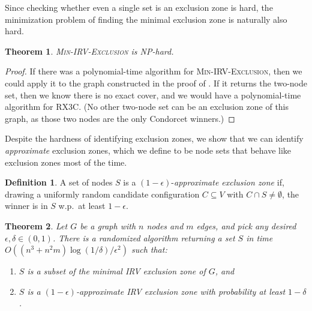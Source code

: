 \documentclass{article}
\theoremstyle{theorem}
\newtheorem{theorem}{Theorem}
\theoremstyle{definition}
\newtheorem{definition}{Definition}
\begin{document}
Since checking whether even a single set is an exclusion zone is hard, the minimization problem of finding the minimal exclusion zone is naturally also hard.

\begin{theorem}
  \textsc{Min-IRV-Exclusion} is NP-hard.
\end{theorem}
\begin{proof}
If there was a polynomial-time algorithm for  \textsc{Min-IRV-Exclusion}, then we could apply it to the graph constructed in the proof of . If it returns the two-node set, then we know there is no exact cover, and we would have a polynomial-time algorithm for \textsc{RX3C}. (No other two-node set can be an exclusion zone of this graph, as those two nodes are the only Condorcet winners.)
\end{proof}


Despite the hardness of identifying exclusion zones, we show that we can identify \emph{approximate} exclusion zones, which we define to be node sets that behave like exclusion zones most of the time.

\begin{definition}
  A set of nodes $S$ is a $(1-\epsilon)$-\emph{approximate exclusion zone} if, drawing a uniformly random candidate configuration $C \subseteq V$ with $C \cap S \ne \emptyset$, the winner is in $S$ w.p.\ at least $1- \epsilon$.  
\end{definition}

\begin{theorem}\label{thm:approx}
  Let $G$ be a graph with $n$ nodes and $m$ edges, and pick any desired  $\epsilon,\delta \in (0, 1)$. There is a randomized algorithm returning a set $S$ in time $O((n^3 +n^2m)\log(1/\delta)/\epsilon^2)$ such that:
  \begin{enumerate}
    \item $S$ is a subset of the minimal IRV exclusion zone of $G$, and
    \item $S$ is a $(1-\epsilon)$-approximate IRV exclusion zone with probability at least $1-\delta$.
  \end{enumerate}
\end{theorem}
\end{document}
